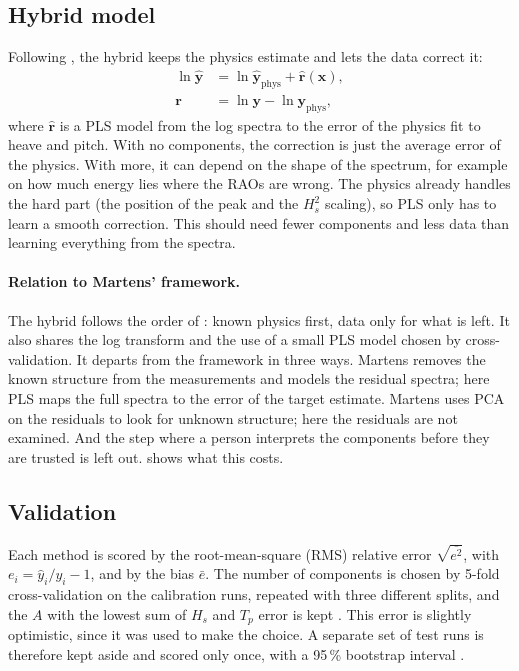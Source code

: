 \documentclass[10pt,a4paper,twocolumn,twoside]{article}
\newcommand{\Hs}{H_{s}}
\newcommand{\Tp}{T_{p}}
\newcommand{\vect}[1]{\boldsymbol{#1}}
\begin{document}
\subsection{Hybrid model}
\label{sec:theory_hybrid}

Following \citet{martens2023}, the hybrid keeps the physics estimate and lets the data correct it:
\begin{equation}
\begin{split}
\ln \hat{\vect y} &= \ln \hat{\vect y}_{\text{phys}} + \hat{\vect r}(\vect x),
\\
\vect r &= \ln\vect y - \ln\vect y_{\text{phys}},
\end{split}
\label{eq:hybrid}
\end{equation}
where $\hat{\vect r}$ is a PLS model from the log spectra to the error of the physics fit to heave
and pitch. With no components, the correction is just the average error of the physics. With more,
it can depend on the shape of the spectrum, for example on how much energy lies where the RAOs are
wrong. The physics already handles the hard part (the position of the peak and the $\Hs^2$
scaling), so PLS only has to learn a smooth correction. This should need fewer components and less
data than learning everything from the spectra.

\paragraph{Relation to Martens' framework.}
The hybrid follows the order of \citet{martens2023}: known physics first, data only for what is
left. It also shares the log transform and the use of a small PLS model chosen by
cross-validation. It departs from the framework in three ways. Martens removes the known structure
from the measurements and models the residual spectra; here PLS maps the full spectra to the error
of the target estimate. Martens uses PCA on the residuals to look for unknown structure; here the
residuals are not examined. And the step where a person interprets the components before they are
trusted is left out.  shows what this costs.

\subsection{Validation}
\label{sec:theory_validation}

Each method is scored by the root-mean-square (RMS) relative error $\sqrt{\overline{e^2}}$, with
$e_i = \hat y_i/y_i - 1$, and by the bias $\bar e$. The number of components is chosen by 5-fold
cross-validation on the calibration runs, repeated with three different splits, and the $A$ with
the lowest sum of $\Hs$ and $\Tp$ error is kept \citep{hastie2009}. This error is slightly
optimistic, since it was used to make the choice. A separate set of test runs is therefore kept
aside and scored only once, with a 95\,\% bootstrap interval \citep{hastie2009}.
\end{document}
